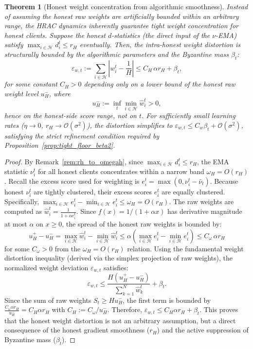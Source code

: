 \documentclass[11pt,a4paper]{article}
\newtheorem{theorem}{Theorem}
\theoremstyle{remark}
\newcommand{\HH}{\mathcal{H}}
\begin{document}
\begin{theorem}[Honest weight concentration from algorithmic smoothness]
\label{thm:honest_weight_concentration}
Instead of assuming the honest raw weights are artificially bounded within an arbitrary range, the HRAC dynamics inherently guarantee tight weight concentration for honest clients.
Suppose the honest \(d\)-statistics (the direct input of the \(\nu\)-EMA)
satisfy \(\max_{i\in\HH} d_i^t \le r_H\) eventually.
Then, the intra-honest weight distortion is structurally bounded by the algorithmic parameters and the Byzantine mass $\beta_t$:
\begin{equation}
    \varepsilon_{w,t} 
    := 
    \sum_{i\in\HH}\left|w_i^t-\frac{1}{H}\right| 
    \le 
    C_H\,\alpha r_H + \beta_t,
    \label{eq:structural_epsw_bound}
\end{equation}
for some constant \(C_H>0\) depending only on a lower bound of the honest raw
weight level \(u_H^{-}\), where
\[
    u_H^{-}
    :=
    \inf_t \min_{i\in\HH}\hat w_i^t
    > 0,
\]
hence on the honest-side score range, not on \(t\).
For sufficiently small learning rates ($\eta \to 0$, $r_H \to \mathcal{O}(\sigma^2)$), the distortion simplifies to $\varepsilon_{w,t} \le C_w \beta_t + \mathcal{O}(\sigma^2)$, satisfying the strict refinement condition required by Proposition~\ref{prop:tight_floor_beta2}.
\end{theorem}

\begin{proof}
By Remark~\ref{rem:rh_to_omegah}, since $\max_{i\in\HH} d_i^t \le r_H$, the EMA statistic $\nu_i^t$ for all honest clients concentrates within a narrow band $\omega_H = O(r_H)$.
Recall the excess score used for weighting is $e_i^t = \max(0, \nu_i^t - \bar{\nu}_t)$. 
Because honest $\nu_i^t$ are tightly clustered, their excess scores $e_i^t$ are equally clustered. Specifically,
\(
\max_{i\in\HH} e_i^t - \min_{i\in\HH} e_i^t \le \omega_H = O(r_H).
\)
The raw weights are computed as $\hat{w}_i^t = \frac{1}{1+\alpha e_i^t}$. 
Since \(f(x)=1/(1+\alpha x)\) has derivative magnitude at most \(\alpha\) on \(x\ge 0\), the spread of the honest raw weights is bounded by:
\[
    u_H^{+} - u_H^{-} 
    = 
    \max_{i\in\HH} \hat{w}_i^t - \min_{i\in\HH} \hat{w}_i^t 
    \le 
    \alpha \left( \max_{i\in\HH} e_i^t - \min_{i\in\HH} e_i^t \right) 
    \le 
    C_\omega\,\alpha r_H
\]
for some \(C_\omega>0\) from the \(\omega_H=O(r_H)\) relation.
Using the fundamental weight distortion inequality (derived via the simplex projection of raw weights), the normalized weight deviation $\varepsilon_{w,t}$ satisfies:
\[
    \varepsilon_{w,t} 
    \le 
    \frac{H(u_H^{+} - u_H^{-})}{\sum_{k=1}^N \hat{w}_k^t} + \beta_t.
\]
Since the sum of raw weights $S_t \ge H u_H^{-}$, the first term is bounded by
\(
\frac{C_\omega\alpha r_H}{u_H^{-}}
=
C_H\alpha r_H
\)
with \(C_H:=C_\omega/u_H^{-}\). Therefore,
\(\varepsilon_{w,t} \le C_H\alpha r_H + \beta_t\).
This proves that the honest weight distortion is not an arbitrary assumption, but a direct consequence of the honest gradient smoothness ($r_H$) and the active suppression of Byzantine mass ($\beta_t$).
\end{proof}
\end{document}
